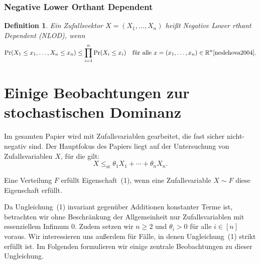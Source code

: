 \documentclass[
12pt,
fancyheadings, %
%
a4paper, 
%
]{tuhhreprt}
\newtheorem{definition}{Definition}[chapter]
\begin{document}
\subsection{Negative Lower Orthant Dependent}
\begin{definition}
Ein Zufallsvektor \( X = (X_1, \ldots, X_n) \) heißt \textit{Negative Lower rthant Dependent} (NLOD), wenn
\[
\Pr(X_1 \leq x_1, \ldots, X_n \leq x_n) \leq \prod_{i=1}^n \Pr(X_i \leq x_i) \quad \text{für alle } x = (x_1, \ldots, x_n) \in \mathbb{R}^n \cite[p.~53]{neslehova2004}.
\]
\end{definition}


\chapter{Einige Beobachtungen zur stochastischen Dominanz}
Im gesamten Papier wird mit Zufallsvariablen gearbeitet, die fast sicher nicht-negativ sind. Der Hauptfokus des Papiers liegt auf der Untersuchung von Zufallsvariablen \( X \), für die gilt:  
\begin{equation}
X \leq_{\text{st}} \theta_1 X_1 + \cdots + \theta_n X_n.
\tag{1}
\end{equation}

\noindent Eine Verteilung \( F \) erfüllt Eigenschaft~(1), wenn eine Zufallsvariable \( X \sim F \) diese Eigenschaft erfüllt. \cite{ChenShneer2024}

Da Ungleichung~(1) invariant gegenüber Additionen konstanter Terme ist, betrachten wir ohne Beschränkung der Allgemeinheit nur Zufallsvariablen mit essenziellem Infimum 0. Zudem setzen wir \( n \geq 2 \) und \( \theta_i > 0 \) für alle \( i \in [n] \) voraus. Wir interessieren uns außerdem für Fälle, in denen Ungleichung~(1) strikt erfüllt ist. Im Folgenden formulieren wir einige zentrale Beobachtungen zu dieser Ungleichung. \cite{ChenShneer2024}
\end{document}
